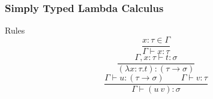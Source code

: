\documentclass[14pt,compress]{beamer}
\begin{document}
\begin{frame}\label{frame : rules of simply typed lambda calculus}
\frametitle{Simply Typed Lambda Calculus}

\begin{block}{Rules}
\pause
\[ \frac{x{:}\tau \in \Gamma}{\Gamma \vdash x{:}\tau} \]
\pause
\[ \frac{\Gamma, x{:}\tau \vdash {t}:\sigma}{(\lambda x{:}\tau.t) : (\tau \to \sigma)} \]
\pause
\[ \frac{\Gamma \vdash u{:}(\tau \to \sigma) \qquad \Gamma \vdash v{:}\tau}
        {\Gamma \vdash (u\ v){:}\sigma} \]
\end{block}
\end{frame}
\end{document}
